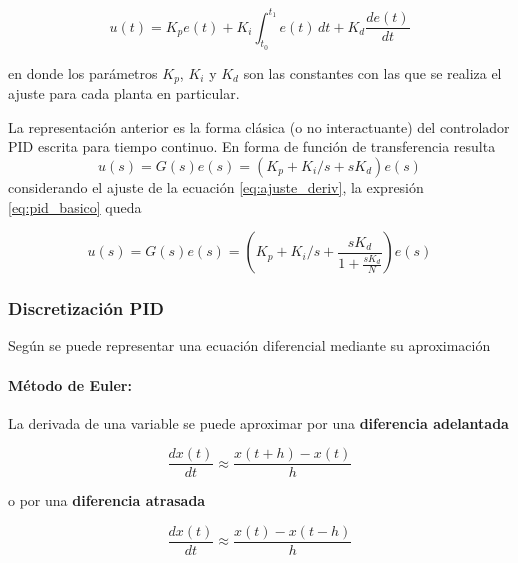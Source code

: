 \documentclass[10pt,conference,a4paper,onecolumn]{article}%
\begin{document}
\begin{equation}
u(t)=K_pe(t)+K_i \int_{t_0}^{t_1} e(t) \,dt + K_d \frac{de(t)}{dt}
\end{equation}

en donde los parámetros $K_p$, $K_i$ y $K_d$ son las constantes con las que se realiza el ajuste para cada planta en particular. 

La representación anterior es la forma clásica (o no interactuante) del controlador PID escrita para tiempo continuo. En forma de función de transferencia resulta
\begin{equation}
u(s)=G(s)e(s)=\left(K_p + K_i/s + sK_d \right)e(s)
\label{eq:pid_basico}
\end{equation}
considerando el ajuste de la ecuación \ref{eq:ajuste_deriv}, la expresión \ref{eq:pid_basico} queda

\begin{equation}
u(s)=G(s)e(s)=\left( K_p + K_i/s + \frac{sK_d}{1+\frac{sK_d}{N} } \right)e(s)
\label{eq:pid_final}
\end{equation}



 
 \subsubsection{Discretización PID}
% 
 
 Según \cite[pág. 214]{astrom} se puede representar una ecuación diferencial mediante su aproximación
 
 \paragraph{Método de Euler:} La derivada de una variable se puede aproximar por una \textbf{diferencia adelantada}
 
 \begin{equation}
 \frac{dx(t)}{dt}\approx \frac{x(t+h)-x(t)}{h}
 \end{equation}
  
  o por  una \textbf{diferencia atrasada}
  
   \begin{equation}
 \frac{dx(t)}{dt}\approx \frac{x(t)-x(t-h)}{h}
 \end{equation}
  
\end{document}
